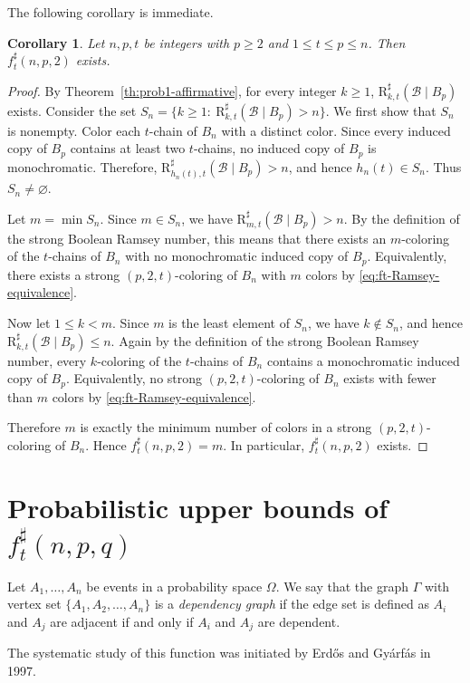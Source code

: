 \documentclass[twoside,12pt]{article}
\newtheorem{corollary}[theorem]{Corollary}
\newcommand{\BRs}{\mathrm{R}^{\sharp}}
\begin{document}
The following corollary is immediate. 
\begin{corollary}\label{cor:existence-ft}
Let $n,p,t$ be integers with $p\ge 2$ and $1\le t\le p\le n$. Then
$f_t^\sharp(n,p,2)$
exists.
\end{corollary}
\begin{proof}
By Theorem~\ref{th:prob1-affirmative}, for every integer $k\ge 1$, 
$\BRs_{k,t}(\mathcal B\mid B_p)$
exists.
Consider the set
$S_n=\{k\ge 1:\ \BRs_{k,t}(\mathcal B\mid B_p)>n\}$.
We first show that $S_n$ is nonempty. Color each $t$-chain of $B_n$ with a distinct
color. Since every induced copy of $B_p$ contains at least two $t$-chains, no induced
copy of $B_p$ is monochromatic. Therefore, 
$\BRs_{h_n(t),t}(\mathcal B\mid B_p)>n$,
and hence $h_n(t)\in S_n$. Thus $S_n\neq\varnothing$.

Let $m=\min S_n$.
Since $m\in S_n$, we have $\BRs_{m,t}(\mathcal B\mid B_p)>n$. By the definition of the
strong Boolean Ramsey number, this means that there exists an $m$-coloring of the
$t$-chains of $B_n$ with no monochromatic induced copy of $B_p$. Equivalently, there
exists a strong $(p,2,t)$-coloring of $B_n$ with $m$ colors by \eqref{eq:ft-Ramsey-equivalence}.

Now let $1\le k<m$. Since $m$ is the least element of $S_n$, we have $k\notin S_n$, and hence
$\BRs_{k,t}(\mathcal B\mid B_p)\le n$.
Again by the definition of the strong Boolean Ramsey number, every $k$-coloring of the
$t$-chains of $B_n$ contains a monochromatic induced copy of $B_p$. Equivalently, no
strong $(p,2,t)$-coloring of $B_n$ exists with fewer than $m$ colors by \eqref{eq:ft-Ramsey-equivalence}.

Therefore $m$ is exactly the minimum number of colors in a strong $(p,2,t)$-coloring
of $B_n$. Hence
$f_t^\sharp(n,p,2)=m$.
In particular, $f_t^\sharp(n,p,2)$ exists.
\end{proof}


\section{Probabilistic upper bounds of $f_t^{\sharp}(n, p, q)$}
\label{sec3}

Let $A_1,\ldots,A_n$ be events in a probability space $\Omega$. We
say that the graph $\Gamma$ with vertex set $\{A_1,A_2,\ldots,A_n\}$ is a
\emph{dependency graph} if the edge set is defined as
$A_{i}$ and $A_j$ are adjacent if and only if $A_i$ and $A_{j}$ are dependent.

The systematic study of this function was initiated by Erdős and Gyárfás \cite{EG97} in 1997.
\end{document}
